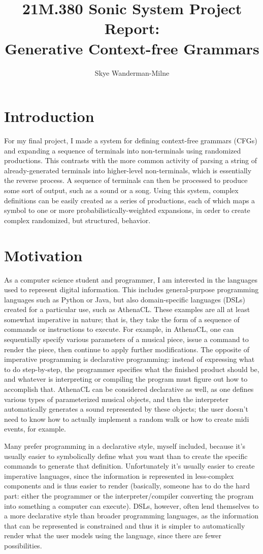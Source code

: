 \documentclass[11pt]{article}
\author{Skye Wanderman-Milne}
\title{21M.380 Sonic System Project Report:\\Generative Context-free Grammars}
\date{}
\begin{document}
\maketitle

\section*{Introduction}
For my final project, I made a system for defining context-free grammars
(CFGs) and expanding a sequence of terminals into non-terminals using
randomized productions.  This contrasts with the more common activity of
parsing a string of already-generated terminals into higher-level
non-terminals, which is essentially the reverse process.  A sequence of
terminals can then be processed to produce some sort of output, such as a
sound or a song.  Using this system, complex definitions can be easily created
as a series of productions, each of which maps a symbol to one or more
probabilistically-weighted expansions, in order to create complex randomized,
but structured, behavior.

\section*{Motivation}
As a computer science student and programmer, I am interested in the languages
used to represent digital information.  This includes general-purpose
programming languages such as Python or Java, but also domain-specific
languages (DSLs) created for a particular use, such as AthenaCL.  These
examples are all at least somewhat imperative in nature; that is, they take
the form of a sequence of commands or instructions to execute.  For example,
in AthenaCL, one can sequentially specify various parameters of a musical
piece, issue a command to render the piece, then continue to apply further
modifications.  The opposite of imperative programming is declarative
programming: instead of expressing what to do step-by-step, the programmer
specifies what the finished product should be, and whatever is interpreting
or compiling the program must figure out how to accomplish that.  AthenaCL can
be considered declarative as well, as one defines various types of
parameterized musical objects, and then the interpreter automatically
generates a sound represented by these objects; the user doesn't need to know
how to actually implement a random walk or how to create midi events, for
example.

Many prefer programming in a declarative style, myself included, because it's
usually easier to symbolically define what you want than to create the
specific commands to generate that definition.  Unfortunately it's usually
easier to create imperative languages, since the information is represented in
less-complex components and is thus easier to render (basically, someone has
to do the hard part: either the programmer or the interpreter/compiler
converting the program into something a computer can execute).  DSLs, however,
often lend themselves to a more declarative style than broader programming
languages, as the information that can be represented is constrained and thus
it is simpler to automatically render what the user models using the language,
since there are fewer possibilities.
\end{document}
